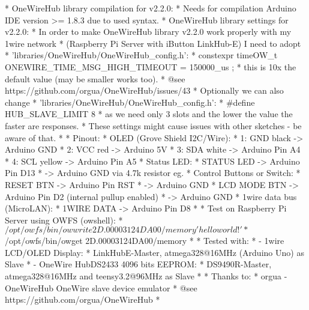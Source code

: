 \begin{DoxyVerb}* OneWireHub library compilation for v2.2.0:
*   Needs for compilation Arduino IDE version >= 1.8.3 due to used syntax.
* OneWireHub library settings for v2.2.0:
*   In order to make OneWireHub library v2.2.0 work properly with my 1wire network
*   (Raspberry Pi Server with iButton LinkHub-E) I need to adopt
*     'libraries/OneWireHub/OneWireHub_config.h':
*       constexpr timeOW_t ONEWIRE_TIME_MSG_HIGH_TIMEOUT     = { 150000_us };
*     this is 10x the default value (may be smaller works too).
*     @see https://github.com/orgua/OneWireHub/issues/43
*   Optionally we can also change
*     'libraries/OneWireHub/OneWireHub_config.h':
*       #define HUB_SLAVE_LIMIT     8
*     as we need only 3 slots and the lower the value the faster are responses.
*   These settings might cause issues with other sketches - be aware of that.
*
* Pinout:
*   OLED (Grove Shield I2C/Wire):
*     1: GND black     -> Arduino GND
*     2: VCC red       -> Arduino 5V
*     3: SDA white     -> Arduino Pin A4
*     4: SCL yellow    -> Arduino Pin A5
*   Status LED:
*        STATUS LED    -> Arduino Pin D13
*                      -> Arduino GND via 4.7k resistor eg.
*   Control Buttons or Switch:
*        RESET BTN     -> Arduino Pin RST
*                      -> Arduino GND
*        LCD MODE BTN  -> Arduino Pin D2 (internal pullup enabled)
*                      -> Arduino GND
*   1wire data bus (MicroLAN):
*        1WIRE DATA    -> Arduino Pin D8
*
* Test on Raspberry Pi Server using OWFS (owshell):
*   $ /opt/owfs/bin/owwrite 2D.00003124DA00/memory 'hello world!'
*   $ /opt/owfs/bin/owget 2D.00003124DA00/memory
*
* Tested with:
*   - 1wire LCD/OLED Display:
*     LinkHubE-Master, atmega328@16MHz (Arduino Uno) as Slave
*   - OneWire HubDS2433 4096 bits EEPROM:
*     DS9490R-Master, atmega328@16MHz and teensy3.2@96MHz as Slave
*
* Thanks to:
* orgua - OneWireHub OneWire slave device emulator
*         @see https://github.com/orgua/OneWireHub
* \end{DoxyVerb}
 

